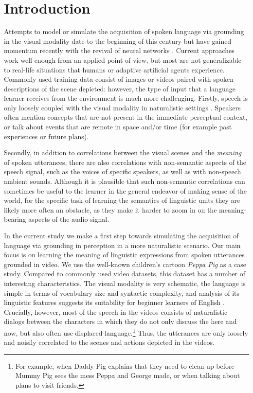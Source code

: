 \section{Introduction}
\label{sec:intro}

Attempts to model or simulate the acquisition of spoken language via
grounding in the visual modality date to the beginning of this century
\citep{roypentland2002learning} but have gained momentum recently
with the revival of neural networks
\citep[e.g.][]{synnaeve2014learning,harwath2015deep,
  harwath2016unsupervised,chrupala-etal-2017-representations,alishahi-etal-2017-encoding,harwath2018jointly,Merkx2019,havard2019models,rouditchenko2020avlnet,khorrami_2021,peng2021fastslow}.
Current approaches work well enough from an applied point of view, 
but most are not generalizable to real-life situations that humans or 
adaptive artificial agents experience. Commonly used training data
consist of images or videos paired with spoken descriptions
of the scene depicted: however, the type of input that a language learner receives 
from the environment is much more challenging.  
Firstly, speech is only loosely coupled with the visual modality in naturalistic settings
 \citep{matusevych2013automatic, beekhuizen2013word}. Speakers often mention 
 concepts that are not present in the immediate perceptual context, 
 or talk about events that are remote in space and/or time (for
 example past experiences or future plans).
 
Secondly, in addition to
correlations between the visual scenes and the {\it meaning} of spoken
utterances, there are also correlations with non-semantic aspects of
the speech signal, such as the voices of specific speakers, as well
as with non-speech ambient sounds. Although it is plausible that such
non-semantic correlations can sometimes be useful to the learner in
the general endeavor of making sense of the world, for the specific
task of learning the semantics of linguistic units they are likely more
often an obstacle, as they make it harder to zoom in on the
meaning-bearing aspects of the audio signal.

In the current study we make a first step towards simulating the
acquisition of language via grounding in perception in a more
naturalistic scenario.  Our main focus is on learning the meaning of
linguistic expressions from spoken utterances grounded in video.  We
use the well-known children's cartoon {\it Peppa Pig} as a case
study. Compared to commonly used video datasets, this dataset has a
number of interesting characteristics.  The visual modality is very
schematic, the language is simple in terms of vocabulary size and
syntactic complexity, and analysis of its linguistic features suggests
its suitability for beginner learners of English
\cite{kokla2021peppa,scheffler2021peppa}.  Crucially, however, most of
the speech in the videos consists of naturalistic dialogs between the
characters in which they do not only discuss the here and now, but
also often use displaced language.\footnote{For example, when Daddy
  Pig explains that they need to clean up before Mummy Pig sees the mess
  Peppa and George made, or when talking about plans to visit
  friends.}  Thus, the utterances are only loosely and noisily
correlated to the scenes and actions depicted in the videos.

